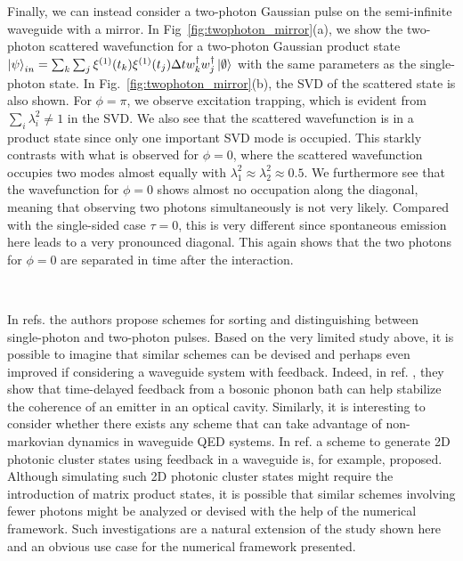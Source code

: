 Finally, we can instead consider a two-photon Gaussian pulse on the semi-infinite waveguide with a mirror. In Fig~\ref{fig:twophoton_mirror}(a), we show the two-photon scattered wavefunction for a two-photon Gaussian product state $\ket{\psi}_{in} = \sum_k \sum_j \xi^{(1)}(t_k)\xi^{(1)}(t_j) \Delta t w_k^\dagger w_j^\dagger \ket{\emptyset}$ with the same parameters as the single-photon state. In Fig.~\ref{fig:twophoton_mirror}(b), the SVD of the scattered state is also shown. For $\phi = \pi$, we observe excitation trapping, which is evident from $\sum_i \lambda_i^2 \neq 1$ in the SVD. We also see that the scattered wavefunction is in a product state since only one important SVD mode is occupied. This starkly contrasts with what is observed for $\phi = 0$, where the scattered wavefunction occupies two modes almost equally with $\lambda_1^2 \approx \lambda_2^2 \approx 0.5$. We furthermore see that the wavefunction for $\phi=0$ shows almost no occupation along the diagonal, meaning that observing two photons simultaneously is not very likely. Compared with the single-sided case $\tau=0$, this is very different since spontaneous emission here leads to a very pronounced diagonal. This again shows that the two photons for $\phi=0$ are separated in time after the interaction.  

\

In refs. \cite{Witthaut2012PhotonEmitters,Lund2023PerfectPulse} the authors propose schemes for sorting and distinguishing between single-photon and two-photon pulses. Based on the very limited study above, it is possible to imagine that similar schemes can be devised and perhaps even improved if considering a waveguide system with feedback. Indeed, in ref. \cite{Nemet2019StabilizingTemperature}, they show that time-delayed feedback from a bosonic phonon bath can help stabilize the coherence of an emitter in an optical cavity. Similarly, it is interesting to consider whether there exists any scheme that can take advantage of non-markovian dynamics in waveguide QED systems. In ref. \cite{Pichler2017UniversalFeedback} a scheme to generate 2D photonic cluster states using feedback in a waveguide is, for example, proposed. Although simulating such 2D photonic cluster states might require the introduction of matrix product states, it is possible that similar schemes involving fewer photons might be analyzed or devised with the help of the numerical framework. Such investigations are a natural extension of the study shown here and an obvious use case for the numerical framework presented. 


